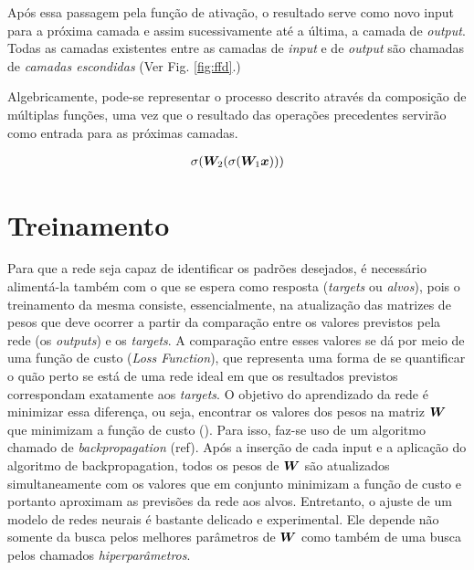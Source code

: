 Após essa passagem pela função de ativação, o resultado serve como novo input para a próxima camada e assim sucessivamente até a última, a camada de \textit{output}. Todas as camadas existentes entre as camadas de \textit{input} e de \textit{output} são chamadas de \textit{camadas escondidas} (Ver Fig. \ref{fig:ffd}.)


Algebricamente, pode-se representar o processo descrito através da composição de múltiplas funções, uma vez que o resultado das operações precedentes servirão como entrada para as próximas camadas.

\begin{align}
\sigma(\bm{W}_2 (\sigma(\bm{W}_1\bm{x})))
\end{align}



\section{Treinamento}

Para que a rede seja capaz de identificar os padrões desejados, é necessário alimentá-la também com o que se espera como resposta (\textit{targets} ou \textit{alvos}), pois o treinamento da mesma consiste, essencialmente, na atualização das matrizes de pesos que deve ocorrer a partir da comparação entre os valores previstos pela rede (os \textit{outputs}) e os \textit{targets}. A comparação entre esses valores se dá por meio de uma função de custo (\textit{Loss Function}), que representa uma forma de se quantificar o quão perto se está de uma rede ideal em que os resultados previstos correspondam exatamente aos \textit{targets}. O objetivo do aprendizado da rede é minimizar essa diferença, ou seja, encontrar os valores dos pesos na matriz $\bm{W}$ que minimizam a função de custo (\cite{josh:2017}). Para isso, faz-se uso de um algoritmo chamado de \textit{backpropagation} (ref). Após a inserção de cada input e a aplicação do algoritmo de backpropagation, todos os pesos de $\bm{W}$ são atualizados simultaneamente com os valores que em conjunto minimizam a função de custo e portanto aproximam as previsões da rede aos alvos. Entretanto, o ajuste de um modelo de redes neurais é bastante delicado e experimental. Ele depende não somente da busca pelos melhores parâmetros de $\bm{W}$ como também de uma busca pelos chamados \textit{hiperparâmetros}. 


